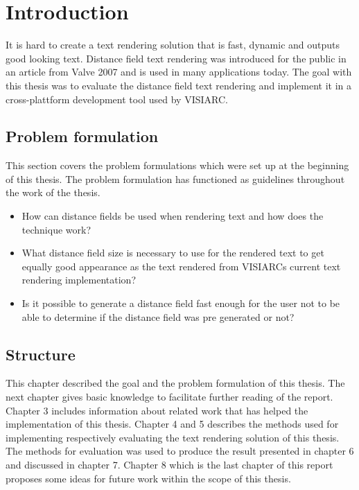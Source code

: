 \chapter{Introduction}\label{cha:intro}
It is hard to create a text rendering solution that is fast, dynamic and outputs good looking text. Distance field text rendering was introduced for the public in an article from Valve 2007 and is used in many applications today. The goal with this thesis was to evaluate the distance field text rendering and implement it in a cross-plattform development tool used by VISIARC.
\section{Problem formulation}
This section covers the problem formulations which were set up at the beginning of this thesis. The problem formulation has functioned as guidelines throughout the work of the thesis.
\begin{itemize}
  \item How can distance fields be used when rendering text and how does the technique work?
  \item What distance field size is necessary to use for the rendered text to get equally good appearance as the text rendered from VISIARCs current text rendering implementation?
  \item Is it possible to generate a distance field fast enough for the user not to be able to determine if the distance field was pre generated or not?
\end{itemize} 
\section{Structure}
This chapter described the goal and the problem formulation of this thesis. The next chapter gives basic knowledge to facilitate further reading of the report. Chapter 3 includes information about related work that has helped the implementation of this thesis. Chapter 4 and 5 describes the methods used for implementing respectively evaluating the text rendering solution of this thesis. The methods for evaluation was used to produce the result presented in chapter 6 and discussed in chapter 7. Chapter 8 which is the last chapter of this report proposes some ideas for future work within the scope of this thesis.
